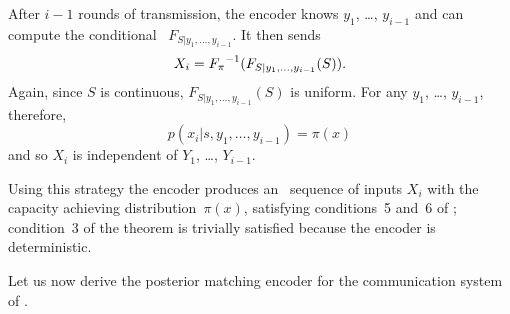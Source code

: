 After $i-1$ rounds of transmission, the encoder knows $y_1$, \ldots, $y_{i-1}$
and can compute the conditional \cdf\ $F_{S|y_1, \ldots, y_{i-1}}$. It then
sends
\begin{equation}
  \label{eq:posteriorxi}
  X_i = {F_{\pi}}^{-1}(F_{S|y_1,\dots,y_{i-1}}(S)).
\end{equation}
Again, since $S$ is continuous, $F_{S|y_1, \dots, y_{i-1}}(S)$ is uniform. For
any $y_1$, \ldots, $y_{i-1}$, therefore, \begin{equation*}
  p(x_i|s, y_1, \dots, y_{i-1}) = \pi(x)
\end{equation*}
and so $X_i$ is independent of $Y_1$, \ldots, $Y_{i-1}$. 

Using this strategy the encoder produces an \iid\ sequence of inputs $X_i$
with the capacity achieving distribution~$\pi(x)$, satisfying conditions~5
and~6 of ; condition~3 of the theorem is
trivially satisfied because the encoder is deterministic.

Let us now derive the posterior matching encoder for the communication system of
.

